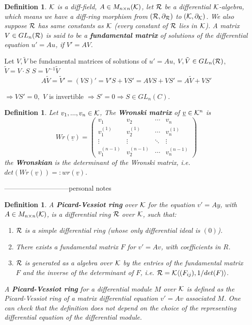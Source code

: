 \documentclass[11pt]{article}
\newtheorem{dfn}[thm]{Definition}
\newcommand{\pd}{\partial}
\newcommand{\calk}{{\cal K}}
\newcommand{\calr}{{\cal R}}
\begin{document}
\begin{dfn}
$\calk$ is a diff-field, $A\in M_{n\times n}(\calk)$, let $\calr$ be a differential $\calk$-algebra, which means we have a diff-ring morphism from $(\calr,\pd_\calr)$ to $(\calk,\pd_\calk)$. We also suppose $\calr$ has same constants as $\calk$ (every constant of $\calr$ lies in $\calk$).
A matrix $V\in GL_n(\calr)$ is said to be a \textbf{fundamental matrix} of solutions of the differential equation $u'=A u$, if $V'=A V$.
\end{dfn}
Let $V,\tilde{V}$ be fundamental matrices of solutions of $u'=A u$, $V,\tilde{V}\in GL_{n}(\calr)$, $\tilde{V} =V\cdot S$ $S=V^{-1} \tilde{V}$
$$
A\tilde{V}=\tilde{V}'=(VS)'=V'S+V S'=A V S+V S'=A \tilde{V}+V S'
$$

$
\Longrightarrow V S'=0,
$
$V$ is invertible $\Longrightarrow S'=0\Longrightarrow S\in GL_n(C)$.

\begin{dfn}
Let $v_1,...,v_n\in \calk$, The \textbf{Wronski matrix} of $\underline{v}\in \calk^n$
is 
$$
Wr(\underline{v})=
\begin{pmatrix}
v_1  & v_2 & \cdots & v_n\\
v_1^{(1)} & v_2^{(1)} & \cdots & v_n^{(1)}\\
\vdots  & \vdots & \ddots & \vdots \\
v_1^{(n-1)} & v_2^{(n-1)} & \cdots & v_n^{(n-1)}
\end{pmatrix}
$$
the \textbf{Wronskian} is the determinant of the Wronski matrix, i.e. $det(Wr(\underline{v}))=:wr(\underline{v})$.
\end{dfn}

-----------------------------personal notes
\begin{dfn}
 A \textbf{Picard-Vessiot ring} over $\calk$ for the equation $v'=A y$, with $A\in M_{n\times n}(\calk)$, is a differential ring $\calr$ over $\calk$, such that:
\begin{enumerate}
\item $\calr$ is a simple differential ring (whose only differential ideal is $(0)$).
\item There exists a fundamental matrix $F$ for $v'=A v$, with coefficients in $R$.
\item $\calr$ is generated as a algebra over $\calk$ by the entries of the fundamental matrix $F$ and the inverse of the determinant of $F$, i.e. $\calr=\calk\langle(F_{ij}), 1/det(F)\rangle$.
\end{enumerate}
A \textbf{Picard-Vessiot ring} for a differential module $M$ over $\calk$ is defined as the Picard-Vessiot ring of a matrix differential equation $v'=A v$ associated $M$. One can check that the definition does not depend on the choice of the representing differential equation of the differential module.
\end{dfn}
\end{document}
